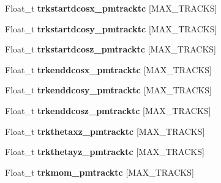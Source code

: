 \begin{DoxyCompactItemize}
\item 
\hypertarget{classanatree_ac4dd1f89a416b66137d08d095bc95924}{Float\-\_\-t {\bfseries trkstartdcosx\-\_\-pmtracktc} \mbox{[}M\-A\-X\-\_\-\-T\-R\-A\-C\-K\-S\mbox{]}}\label{classanatree_ac4dd1f89a416b66137d08d095bc95924}

\item 
\hypertarget{classanatree_af63bd0dbe683b30ccf1882e5fda858f0}{Float\-\_\-t {\bfseries trkstartdcosy\-\_\-pmtracktc} \mbox{[}M\-A\-X\-\_\-\-T\-R\-A\-C\-K\-S\mbox{]}}\label{classanatree_af63bd0dbe683b30ccf1882e5fda858f0}

\item 
\hypertarget{classanatree_a6b97cf78b767eed767cb559aec37e65c}{Float\-\_\-t {\bfseries trkstartdcosz\-\_\-pmtracktc} \mbox{[}M\-A\-X\-\_\-\-T\-R\-A\-C\-K\-S\mbox{]}}\label{classanatree_a6b97cf78b767eed767cb559aec37e65c}

\item 
\hypertarget{classanatree_a7066a3aeab48d8c18b61cefebb0180f5}{Float\-\_\-t {\bfseries trkenddcosx\-\_\-pmtracktc} \mbox{[}M\-A\-X\-\_\-\-T\-R\-A\-C\-K\-S\mbox{]}}\label{classanatree_a7066a3aeab48d8c18b61cefebb0180f5}

\item 
\hypertarget{classanatree_a674ba281b17125d64e8cdbfb9b184dfc}{Float\-\_\-t {\bfseries trkenddcosy\-\_\-pmtracktc} \mbox{[}M\-A\-X\-\_\-\-T\-R\-A\-C\-K\-S\mbox{]}}\label{classanatree_a674ba281b17125d64e8cdbfb9b184dfc}

\item 
\hypertarget{classanatree_abadcd4b5472c86ce857cb3813afab6be}{Float\-\_\-t {\bfseries trkenddcosz\-\_\-pmtracktc} \mbox{[}M\-A\-X\-\_\-\-T\-R\-A\-C\-K\-S\mbox{]}}\label{classanatree_abadcd4b5472c86ce857cb3813afab6be}

\item 
\hypertarget{classanatree_aec0692e36120ad9fb508a85e2044e03d}{Float\-\_\-t {\bfseries trkthetaxz\-\_\-pmtracktc} \mbox{[}M\-A\-X\-\_\-\-T\-R\-A\-C\-K\-S\mbox{]}}\label{classanatree_aec0692e36120ad9fb508a85e2044e03d}

\item 
\hypertarget{classanatree_a85bee7d326090b7394d5eead814a4229}{Float\-\_\-t {\bfseries trkthetayz\-\_\-pmtracktc} \mbox{[}M\-A\-X\-\_\-\-T\-R\-A\-C\-K\-S\mbox{]}}\label{classanatree_a85bee7d326090b7394d5eead814a4229}

\item 
\hypertarget{classanatree_a33b7628b822ea1025e2a2972469e4a37}{Float\-\_\-t {\bfseries trkmom\-\_\-pmtracktc} \mbox{[}M\-A\-X\-\_\-\-T\-R\-A\-C\-K\-S\mbox{]}}\label{classanatree_a33b7628b822ea1025e2a2972469e4a37}


\end{DoxyCompactItemize}
